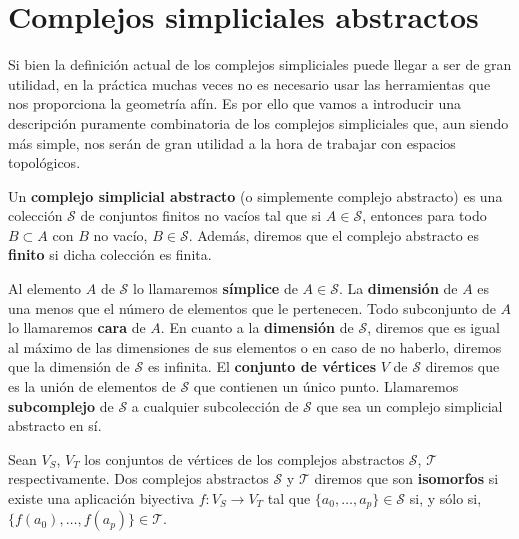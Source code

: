 \section{Complejos simpliciales abstractos}

Si bien la definición actual de los complejos simpliciales puede llegar a ser de
gran utilidad, en la práctica muchas veces no es necesario usar las herramientas
que nos proporciona la geometría afín. Es por ello que vamos a introducir una
descripción puramente combinatoria de los complejos simpliciales que, aun siendo
más simple, nos serán de gran utilidad a la hora de trabajar con espacios
topológicos.

\begin{definicion}
	Un \textbf{complejo simplicial abstracto} (o simplemente complejo abstracto)
	es una colección $\mathcal{S}$ de conjuntos finitos no vacíos tal que si
	$A \in \mathcal{S}$, entonces para todo $B \subset A$ con $B$ no vacío,
	$B \in \mathcal{S}$. Además, diremos que el complejo abstracto es \textbf{finito}
	si dicha colección es finita.
\end{definicion}

Al elemento $A$ de $\mathcal{S}$ lo llamaremos \textbf{símplice} de
$A \in \mathcal{S}$. La \textbf{dimensión} de $A$ es una menos que el número de
elementos que le pertenecen. Todo subconjunto de $A$ lo llamaremos \textbf{cara}
de $A$. En cuanto a la \textbf{dimensión} de $\mathcal{S}$, diremos que es igual
al máximo de las dimensiones de sus elementos o en caso de no haberlo, diremos
que la dimensión de $\mathcal{S}$ es infinita. El \textbf{conjunto de vértices}
$V$ de $\mathcal{S}$ diremos que es la unión de elementos de $\mathcal{S}$ que
contienen un único punto. Llamaremos \textbf{subcomplejo} de $\mathcal{S}$ a
cualquier subcolección de $\mathcal{S}$ que sea un complejo simplicial abstracto
en sí.

Sean $V_{S}$, $V_{T}$ los conjuntos de vértices de los complejos abstractos $\mathcal{S}$,
$\mathcal{T}$ respectivamente. Dos complejos abstractos $\mathcal{S}$ y $\mathcal{T}$
diremos que son \textbf{isomorfos} si existe una aplicación biyectiva
$f: V_{S}\rightarrow V_{T}$ tal que $\{a_{0}, \ldots, a_{p}\} \in \mathcal{S}$
si, y sólo si, $\{f(a_{0}), \ldots, f(a_{p})\} \in \mathcal{T}$.

